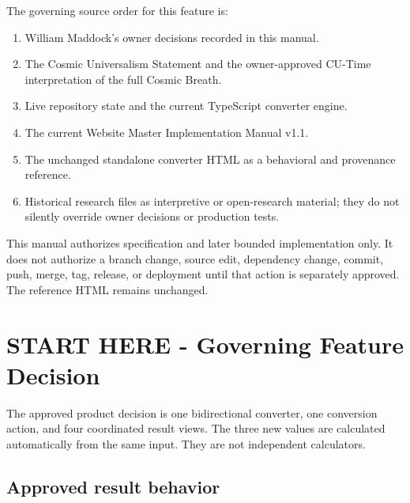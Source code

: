 \documentclass[11pt,letterpaper]{article}
\begin{document}
\begin{authoritybox}
The governing source order for this feature is:
\begin{enumerate}
    \item William Maddock's owner decisions recorded in this manual.
    \item The Cosmic Universalism Statement and the owner-approved CU-Time
          interpretation of the full Cosmic Breath.
    \item Live repository state and the current TypeScript converter engine.
    \item The current Website Master Implementation Manual v1.1.
    \item The unchanged standalone converter HTML as a behavioral and
          provenance reference.
    \item Historical research files as interpretive or open-research material;
          they do not silently override owner decisions or production tests.
\end{enumerate}
\end{authoritybox}

\begin{safetybox}
This manual authorizes specification and later bounded implementation only.
It does not authorize a branch change, source edit, dependency change, commit,
push, merge, tag, release, or deployment until that action is separately
approved. The reference HTML remains unchanged.
\end{safetybox}

\clearpage
\tableofcontents
\clearpage

\section*{START HERE - Governing Feature Decision}

\begin{successbox}
The approved product decision is one bidirectional converter, one conversion
action, and four coordinated result views. The three new values are calculated
automatically from the same input. They are not independent calculators.
\end{successbox}

\subsection*{Approved result behavior}
\end{document}
